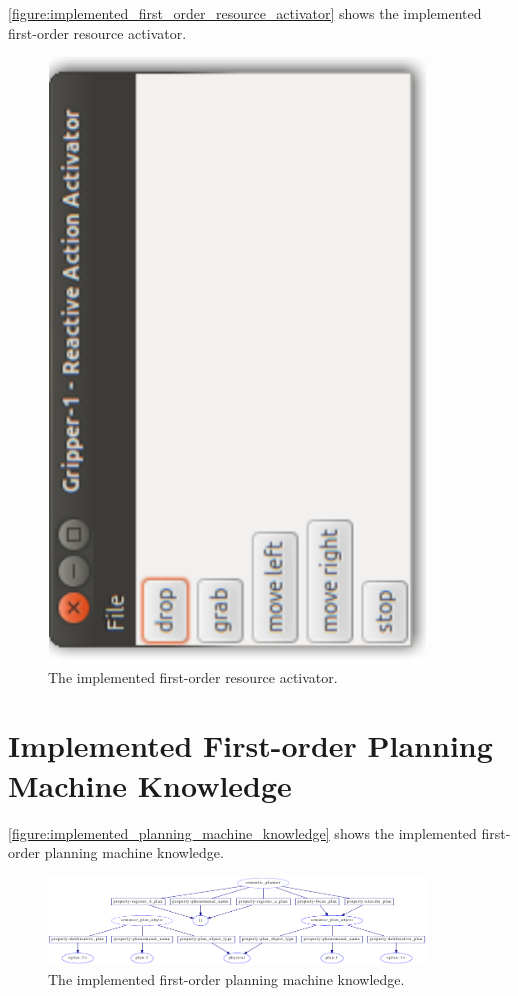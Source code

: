 {\mbox{\autoref{figure:implemented_first_order_resource_activator}}}
shows the implemented first-order resource activator.
\begin{figure}
\includegraphics[width=10cm]{gfx/implemented_first_order_resource_activator}
\caption[The implemented first-order resource activator.]{The
  implemented first-order resource activator.}
\label{figure:implemented_first_order_resource_activator}
\end{figure}

\section{Implemented First-order Planning Machine Knowledge}

{\mbox{\autoref{figure:implemented_planning_machine_knowledge}}} shows
the implemented first-order planning machine knowledge.
\begin{figure}
\includegraphics[width=10cm]{gfx/implemented_planning_machine_knowledge}
\caption[The implemented first-order planning machine knowledge.]{The
  implemented first-order planning machine knowledge.}
\label{figure:implemented_first_order_planning_machine_knowledge}
\end{figure}

